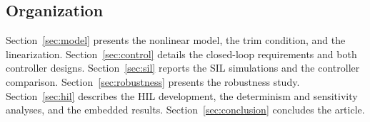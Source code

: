 \subsection{Organization}
Section~\ref{sec:model} presents the nonlinear model, the trim condition,
and the linearization. Section~\ref{sec:control} details the closed-loop
requirements and both controller designs. Section~\ref{sec:sil} reports
the SIL simulations and the controller comparison.
Section~\ref{sec:robustness} presents the robustness study.
Section~\ref{sec:hil} describes the HIL development, the determinism and
sensitivity analyses, and the embedded results.
Section~\ref{sec:conclusion} concludes the article.
